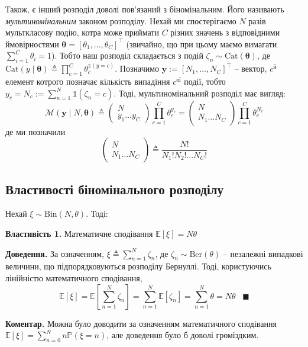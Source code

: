 \documentclass[14pt]{extarticle}
\begin{document}
Також, є інший розподіл доволі пов'язаний з біномінальним. Його називають \textit{мультиномінальним} законом розподілу. Нехай ми спостерігаємо $N$ разів мульткласову подію, котра може приймати $C$ різних значень з відповідними ймовірностями $\boldsymbol{\theta}=[\theta_1,\dots,\theta_C]^{\top}$ (звичайно, що при цьому маємо вимагати $\sum_{i=1}^C \theta_i = 1$). Тобто наш розподіл складається з подій $\zeta_n \sim \text{Cat}(\boldsymbol{\theta})$, де $\text{Cat}(y \mid \boldsymbol{\theta})\triangleq \prod_{c=1}^C \theta_c^{\mathds{1}(y=c)}$. Позначимо $\mathbf{y} := [N_1,\dots,N_C]^{\top}$ -- вектор, $c^{\text{й}}$ елемент котрого позначає кількість випадіння $c^{\text{ої}}$ події, тобто $y_c = N_c := \sum_{n=1}^N \mathds{1}(\zeta_n=c)$. Тоді, мультиномінальний розподіл має вигляд:
\[
\mathcal{M}(\mathbf{y} \mid N,\boldsymbol{\theta}) \triangleq \begin{pmatrix}
    N \\ y_1\dots y_C
\end{pmatrix}\prod_{c=1}^C \theta_c^{y_c} = \begin{pmatrix}
    N \\ N_1\dots N_C
\end{pmatrix}\prod_{c=1}^C \theta_c^{N_c}
\]
де ми позначили
\[
\begin{pmatrix}
    N \\ N_1\dots N_C
\end{pmatrix} \triangleq \frac{N!}{N_1!N_2!\dots N_C!}
\]

\subsection*{Властивості біномінального розподілу}

Нехай $\xi \sim \text{Bin}(N,\theta)$. Тоді:

\textbf{Властивість 1.} Математичне сподівання $\mathbb{E}[\xi]=N\theta$

\textbf{Доведення.} За означенням, $\xi \triangleq \sum_{n=1}^N \zeta_n$, де $\zeta_n \sim \text{Ber}(\theta)$ -- незалежні випадкові величини, що підпорядковуються розподілу Бернуллі. Тоді, користуючись лінійністю математичного сподівання,
\[
\mathbb{E}[\xi] = \mathbb{E}\left[\sum_{n=1}^N \zeta_n\right] = \sum_{n=1}^N \mathbb{E}[\zeta_n] = \sum_{n=1}^N \theta = N\theta \;\;\;\blacksquare
\]

\textbf{Коментар.} Можна було доводити за означенням математичного сподівання $\mathbb{E}[\xi] = \sum_{n=0}^N n\mathbb{P}(\xi=n)$, але доведення було б доволі громіздким.
\end{document}
